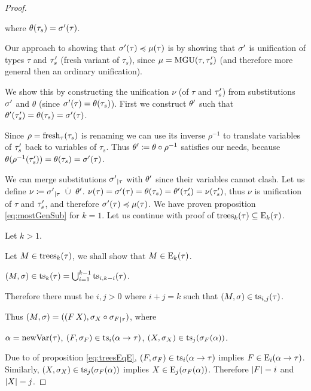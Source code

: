 \documentclass[a4paper,oneside]{memoir}
\begin{document}
\begin{proposition}
\begin{proof}
~

where $\theta(\tau_s) = \sigma^\prime(\tau)$.
 
Our approach to showing that $\sigma^\prime(\tau) \preccurlyeq \mu(\tau)$ is by showing that 
$\sigma^\prime$ is unification of types $\tau$ and $\tau^\prime_s$ (fresh variant of $\tau_s$), 
since $\mu = \operatorname{MGU}(\tau,\tau^\prime_s)$ (and therefore more general then an ordinary unification).

We show this by constructing the unification $\nu$ (of $\tau$ and $\tau^\prime_s$) from substitutions $\sigma^\prime$ and $\theta$ 
(since $\sigma^\prime(\tau) = \theta(\tau_s)$). First we construct $\theta^\prime$ such that $\theta^\prime(\tau^\prime_s) = \theta(\tau_s) = \sigma^\prime(\tau)$.


Since $\rho = \operatorname{fresh}_{\tau}(\tau_s)$ is renaming we can use its inverse $\rho^{-1}$ to translate variables of $\tau^\prime_s$ back to variables of $\tau_s$. Thus $\theta^\prime \coloneqq \theta \circ \rho^{-1}$ satisfies our needs, because $\theta(\rho^{-1}(\tau^\prime_s)) = \theta(\tau_s) = \sigma^\prime(\tau)$. 

We can merge substitutions ${\sigma^\prime}_{\mid \tau}$ with $\theta^\prime$ since their variables cannot clash. 
Let us define $\nu \coloneqq {\sigma^\prime}_{\mid \tau} ~\mathbin{\dot{\cup}}~ \theta^\prime$.
$\nu(\tau) = \sigma^\prime(\tau) = \theta(\tau_s) = \theta^\prime(\tau^\prime_s) = \nu(\tau^\prime_s)$, 
thus $\nu$ is unification of $\tau$ and $\tau^\prime_s$, and therefore $\sigma^\prime(\tau) \preccurlyeq \mu(\tau)$.
We have proven proposition \ref{eq:mostGenSub} for $k = 1$. 
Let us continue with proof of $\operatorname{trees}_{k}(\tau) \subseteq \operatorname{E}_{k}(\tau)$.

Let $k > 1$.

Let $M \in \operatorname{trees}_{k}(\tau)$, we shall show that $M \in \operatorname{E}_{k}(\tau)$.

$(M,\sigma) \in \operatorname{ts}_{k}(\tau) = \bigcup_{i=1}^{k-1}  \operatorname{ts}_{i,k-i}(\tau)$.

Therefore there must be $i,j > 0$ where $i + j = k$ such that $(M,\sigma) \in \operatorname{ts}_{i,j}(\tau)$.

Thus $(M,\sigma) = ((F\,X),{\sigma_{X} \circ \sigma_{F}}_{\mid \tau})$, where

$\alpha = \operatorname{newVar}(\tau)$,
$(F,\sigma_{F}) \in \operatorname{ts}_{i}(\alpha \rightarrow \tau)$,
$(X,\sigma_{X}) \in \operatorname{ts}_{j}(\sigma_{F}(\alpha))$.

Due to \IH of proposition \ref{eq:treesEqE}, 
$(F,\sigma_{F}) \in \operatorname{ts}_{i}(\alpha \rightarrow \tau)$ implies $F \in \operatorname{E}_{i}(\alpha \rightarrow \tau)$.
Similarly, $(X,\sigma_{X}) \in \operatorname{ts}_{j}(\sigma_{F}(\alpha))$ implies $X \in \operatorname{E}_{j}(\sigma_{F}(\alpha))$. 
Therefore $\lvert F \rvert = i$ and $\lvert X \rvert = j$.


\end{proof}
\end{proposition}
\end{document}
